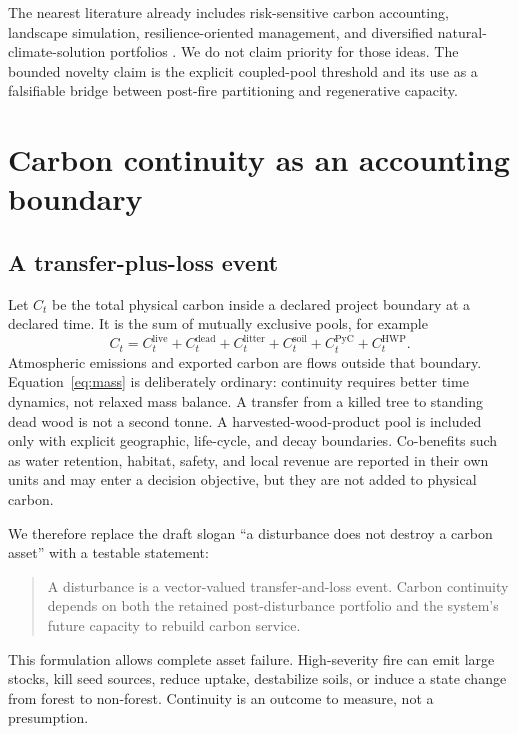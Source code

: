 \documentclass[10pt]{article}
\begin{document}
The nearest literature already includes risk-sensitive carbon accounting,
landscape simulation, resilience-oriented management, and diversified natural-
climate-solution portfolios \cite{foster2020,loudermilk2017,wu2026}.  We do not
claim priority for those ideas.  The bounded novelty claim is the explicit
coupled-pool threshold and its use as a falsifiable bridge between post-fire
partitioning and regenerative capacity.

\section{Carbon continuity as an accounting boundary}

\subsection{A transfer-plus-loss event}

Let $C_t$ be the total physical carbon inside a declared project boundary at a
declared time.  It is the sum of mutually exclusive pools, for example
\begin{equation}
C_t=C_t^{\mathrm{live}}+C_t^{\mathrm{dead}}+C_t^{\mathrm{litter}}
+C_t^{\mathrm{soil}}+C_t^{\mathrm{PyC}}+C_t^{\mathrm{HWP}}.
\label{eq:mass}
\end{equation}
Atmospheric emissions and exported carbon are flows outside that boundary.
Equation~\eqref{eq:mass} is deliberately ordinary: continuity requires better
time dynamics, not relaxed mass balance.  A transfer from a killed tree to
standing dead wood is not a second tonne.  A harvested-wood-product pool is
included only with explicit geographic, life-cycle, and decay boundaries.
Co-benefits such as water retention, habitat, safety, and local revenue are
reported in their own units and may enter a decision objective, but they are
not added to physical carbon.

We therefore replace the draft slogan ``a disturbance does not destroy a
carbon asset'' with a testable statement:

\begin{quote}
A disturbance is a vector-valued transfer-and-loss event.  Carbon continuity
depends on both the retained post-disturbance portfolio and the system's future
capacity to rebuild carbon service.
\end{quote}

This formulation allows complete asset failure.  High-severity fire can emit
large stocks, kill seed sources, reduce uptake, destabilize soils, or induce a
state change from forest to non-forest.  Continuity is an outcome to measure,
not a presumption.
\end{document}
